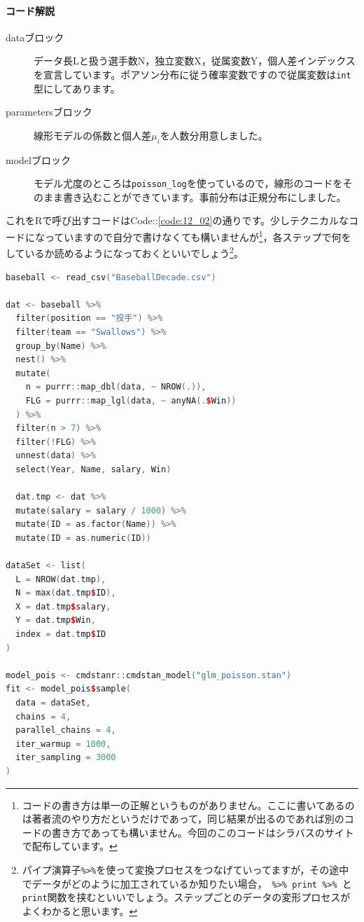 \documentclass{ltjsbook}
\begin{document}
\paragraph{コード解説}
\begin{description}
	\item[dataブロック] データ長Lと扱う選手数N，独立変数X，従属変数Y，個人差インデックスを宣言しています。ポアソン分布に従う確率変数ですので従属変数は\verb|int|型にしてあります。
	\item[parametersブロック] 線形モデルの係数と個人差$\mu_i$を人数分用意しました。
	\item[modelブロック] モデル尤度のところは\verb|poisson_log|を使っているので，線形のコードをそのまま書き込むことができています。事前分布は正規分布にしました。
\end{description}

これをRで呼び出すコードはCode::\ref{code:12_02}の通りです。少しテクニカルなコードになっていますので自分で書けなくても構いませんが\footnote{コードの書き方は単一の正解というものがありません。ここに書いてあるのは著者流のやり方だというだけであって，同じ結果が出るのであれば別のコードの書き方であっても構いません。今回のこのコードはシラバスのサイトで配布しています。}，各ステップで何をしているか読めるようになっておくといいでしょう\footnote{パイプ演算子\verb|%>%|を使って変換プロセスをつなげていってますが，その途中でデータがどのように加工されているか知りたい場合，\verb| %>% print %>% |と\verb|print|関数を挟むといいでしょう。ステップごとのデータの変形プロセスがよくわかると思います。}。

\begin{lstlisting}[language=c++,label={code:12_02},caption={ポアソン回帰のコード}]
baseball <- read_csv("BaseballDecade.csv")

dat <- baseball %>%
  filter(position == "投手") %>%
  filter(team == "Swallows") %>%
  group_by(Name) %>%
  nest() %>%
  mutate(
    n = purrr::map_dbl(data, ~ NROW(.)),
    FLG = purrr::map_lgl(data, ~ anyNA(.$Win))
  ) %>%
  filter(n > 7) %>%
  filter(!FLG) %>%
  unnest(data) %>%
  select(Year, Name, salary, Win)

  dat.tmp <- dat %>%
  mutate(salary = salary / 1000) %>%
  mutate(ID = as.factor(Name)) %>%
  mutate(ID = as.numeric(ID))

dataSet <- list(
  L = NROW(dat.tmp),
  N = max(dat.tmp$ID),
  X = dat.tmp$salary,
  Y = dat.tmp$Win,
  index = dat.tmp$ID
)

model_pois <- cmdstanr::cmdstan_model("glm_poisson.stan")
fit <- model_pois$sample(
  data = dataSet,
  chains = 4,
  parallel_chains = 4,
  iter_warmup = 1000,
  iter_sampling = 3000
)
\end{lstlisting}
\end{document}
